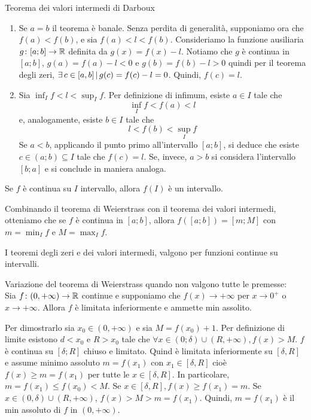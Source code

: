 \documentclass[a4paper]{article}
\begin{document}
\begin{snippetproof}{Teorema dei valori intermedi di Darboux}
    \begin{enumerate}
        \item Se \(a=b\) il teorema è banale.
        Senza perdita di generalità, supponiamo ora che \(f(a) < f(b)\),
        e sia \(f(a) < l < f(b)\). Consideriamo la funzione ausiliaria
        \(g\colon [a;b] \to \mathbb{R}\) definita da \(g(x) = f(x) - l\).
        Notiamo che \(g\) è continua in \([a;b]\), \(g(a) = f(a) - l < 0\)
        e \(g(b) = f(b) - l > 0\) quindi per il teorema degli zeri,
        \(\exists\, c \in [a,b] \,|\, g(c) = f(c) - l = 0\). Quindi,
        \(f(c) = l\).
        \item Sia \(\inf_I f < l < \sup_I f\).
        Per definizione di infimum, esiste \(a\in I\) tale che
        \[
            \inf_I f < f(a) < l
        \]
        e, analogamente, esiste \(b\in I\) tale che
        \[
            l < f(b) < \sup_I f
        \]
        Se \(a<b\), applicando il punto primo all'intervallo \([a;b]\), si deduce che
        esiste \(c\in (a;b) \subseteq I\) tale che \(f(c) = l\).
        Se, invece, \(a>b\) si considera l'intervallo \([b;a]\) e si conclude in maniera analoga.
    \end{enumerate}
\end{snippetproof}

\begin{snippetcorollary}{}
    Se \(f\) è continua su \(I\) intervallo, allora \(f(I)\)
    è un intervallo.
\end{snippetcorollary}

Combinando il teorema di Weierstrass con il teorema dei valori intermedi,
otteniamo che se \(f\) è continua in \([a;b]\), allora \(f([a;b]) = [m;M]\)
con \(m = \min_I f\) e \(M = \max_I f\).

I teoremi degli zeri e dei valori intermedi, valgono per funzioni
continue su intervalli.

Variazione del teorema di Weierstrass quando non valgono tutte le premesse: \\
Sia \(f\colon (0, +\infty) \to \mathbb{R}\) continue e supponiamo che \(f(x) \to +\infty\)
per \(x\to 0^+\) o \(x\to +\infty\).
Allora \(f\) è limitata inferiormente e ammette min assolito.

Per dimostrarlo sia \(x_0 \in (0, +\infty)\) e sia \(M = f(x_0) + 1\).
Per definizione di limite esistono \(d < x_0\) e \(R>x_0\)
tale che \(\forall x \in (0; \delta) \cup (R, +\infty), f(x) > M\).
\(f\) è continua su \([\delta; R]\) chiuso e limitato. Quind è limitata inferiormente
su \([\delta, R]\) e assume minimo assoluto \(m=f(x_1)\) con \(x_1 \in [\delta, R]\)
cioè \(f(x) \geq m = f(x_1)\) per tutte le \(x\in [\delta, R]\).
In particolare, \(m=f(x_1) \leq f(x_0) < M\).
Se \(x\in [\delta, R], f(x) \geq f(x_1) = m\).
Se \(x\in (0, \delta) \cup (R, +\infty)\), \(f(x) > M > m = f(x_1)\).
Quindi, \(m = f(x_1)\) è il min assoluto di \(f\) in \((0, +\infty)\).
\end{document}
